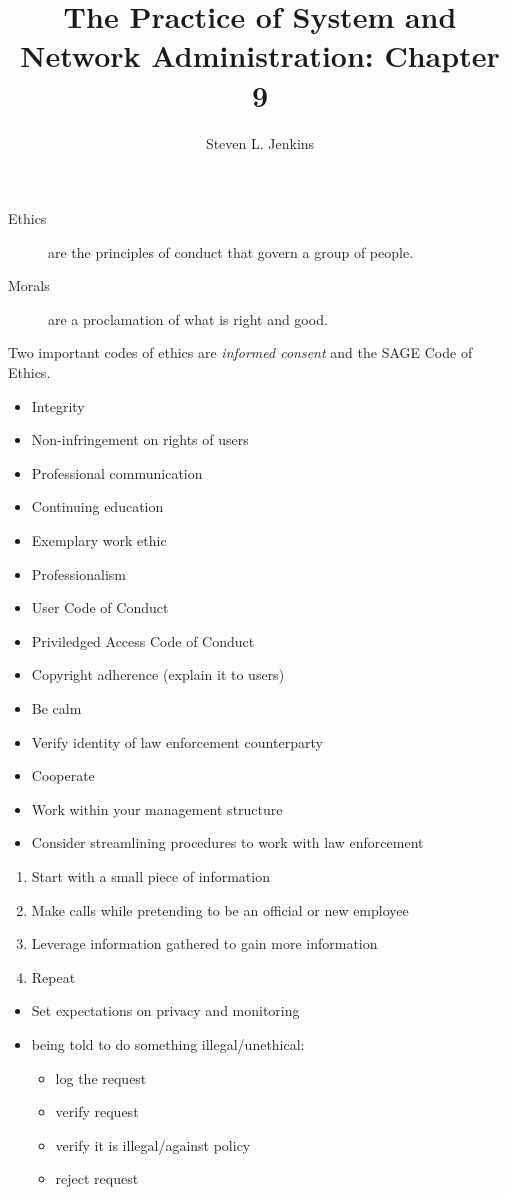 \documentclass{slides}
\title{The Practice of System and Network Administration: Chapter 9}
\author{Steven L. Jenkins}
\newcommand{\bi}{\begin{itemize}}
\newcommand{\ei}{\end{itemize}}
\newcommand{\bd}{\begin{description}}
\newcommand{\ed}{\end{description}}
\newcommand{\be}{\begin{enumerate}}
\newcommand{\ee}{\end{enumerate}}
\begin{document}

\bd
\item[Ethics] are the principles of conduct that govern a group
of people.
\item[Morals] are a proclamation of what is right and good.
\ed

Two important codes of ethics are \emph{informed consent} and the SAGE
Code of Ethics.


\bi
\item Integrity
\item Non-infringement on rights of users
\item Professional communication 
\item Continuing education
\item Exemplary work ethic
\item Professionalism
\ei

\bi
\item User Code of Conduct
\item Priviledged Access Code of Conduct
\item Copyright adherence (explain it to users)
\ei


\bi
\item Be calm
\item Verify identity of law enforcement counterparty
\item Cooperate
\item Work within your management structure
\item Consider streamlining procedures to work with law enforcement
\ei


\be
\item Start with a small piece of information
\item Make calls while pretending to be an official or
	new employee
\item Leverage information gathered to gain more information
\item Repeat
\ee

\bi
\item Set expectations on privacy and monitoring
\item being told to do something illegal/unethical:
	\bi
	\item log the request
	\item verify request
	\item verify it is illegal/against policy
	\item reject request
	\ei
\ei
\end{document}
